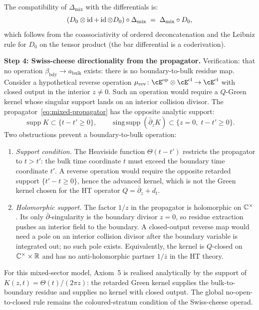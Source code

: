 \begin{example}
The compatibility of $\Delta_{\mathrm{mix}}$ with the
differentials is:
\[
(D_0 \otimes \operatorname{id} + \operatorname{id} \otimes D_0) \circ
\Delta_{\mathrm{mix}}
\;=\;
\Delta_{\mathrm{mix}} \circ D_0,
\]
which follows from the coassociativity of
ordered deconcatenation and the Leibniz rule for $D_0$
on the tensor product (the bar differential is a coderivation).

\smallskip\noindent
\textbf{Step 4: Swiss-cheese directionality from the
propagator.}
Verification: that no operation
$\beta_{\mathrm{bdy}} \to a_{\mathrm{bulk}}$ exists:
there is no boundary-to-bulk residue map. Consider a hypothetical
reverse operation $\mu_{\mathrm{rev}} \colon
\cE^{\mathrm{op}} \otimes \cE^{\mathrm{cl}} \to
\cE^{\mathrm{cl}}$ with closed output in the interior
$z \neq 0$. Such an operation would require a $Q$-Green kernel
whose singular support lands on an interior collision divisor.
The propagator~\eqref{eq:mixed-propagator} has the opposite
analytic support:
\[
\operatorname{supp} K \subset \{t-t'\geq 0\},
\qquad
\operatorname{sing\,supp}(\bar\partial_z K)
\subset \{z=0,\;t-t'\geq 0\}.
\]
Two obstructions prevent a boundary-to-bulk operation:
\begin{enumerate}[label=\textup{(\alph*)}]
\item \emph{Support condition.} The Heaviside function
 $\Theta(t-t')$ restricts the propagator to $t > t'$: the
 bulk time coordinate $t$ must exceed the boundary time
 coordinate $t'$. A reverse operation would require the
 opposite retarded support $\{t'-t\geq 0\}$, hence the
 advanced kernel, which is not the Green kernel chosen for
 the HT operator $Q = \bar\partial_z + d_t$.

\item \emph{Holomorphic support.} The factor $1/z$ in the
 propagator is holomorphic on $\mathbb{C}^\times$. Its only
 $\bar\partial$-singularity is the boundary divisor $z=0$,
 so residue extraction pushes an interior field to the
 boundary. A closed-output reverse map would need a pole on an
 interior collision divisor after the boundary variable is
 integrated out; no such pole exists. Equivalently, the kernel
 is $Q$-closed on $\mathbb{C}^\times \times \mathbb{R}$ and has no
 anti-holomorphic partner $1/\bar z$ in the HT theory.
\end{enumerate}

For this mixed-sector model, Axiom~5 is realised analytically by
the support of $K(z,t) = \Theta(t)/(2\pi z)$: the retarded
Green kernel supplies the bulk-to-boundary residue and supplies
no kernel with closed output. The global no-open-to-closed rule
remains the coloured-stratum condition of the Swiss-cheese
operad.
\end{example}


